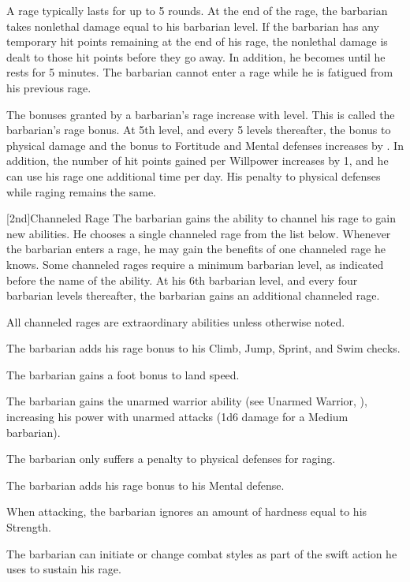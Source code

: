 A rage typically lasts for up to 5 rounds.
At the end of the rage, the barbarian takes nonlethal damage equal to his barbarian level.
If the barbarian has any temporary hit points remaining at the end of his rage, the nonlethal damage is dealt to those hit points before they go away.
In addition, he becomes \fatigued until he rests for 5 minutes.
The barbarian cannot enter a rage while he is fatigued from his previous rage.

The bonuses granted by a barbarian's rage increase with level.
This is called the barbarian's rage bonus.
At 5th level, and every 5 levels thereafter, the bonus to physical damage and the bonus to Fortitude and Mental defenses increases by .
In addition, the number of hit points gained per Willpower increases by 1, and he can use his rage one additional time per day.
His penalty to physical defenses while raging remains the same.

[2nd]{Channeled Rage}
The barbarian gains the ability to channel his rage to gain new abilities.
He chooses a single channeled rage from the list below.
Whenever the barbarian enters a rage, he may gain the benefits of one channeled rage he knows.
Some channeled rages require a minimum barbarian level, as indicated before the name of the ability.
At his 6th barbarian level, and every four barbarian levels thereafter, the barbarian gains an additional channeled rage.

All channeled rages are extraordinary abilities unless otherwise noted.

The barbarian adds his rage bonus to his Climb, Jump, Sprint, and Swim checks.

The barbarian gains a  foot bonus to land speed.

The barbarian gains the unarmed warrior ability (see Unarmed Warrior, ), increasing his power with unarmed attacks (1d6 damage for a Medium barbarian).

The barbarian only suffers a  penalty to physical defenses for raging.

The barbarian adds his rage bonus to his Mental defense.

When attacking, the barbarian ignores an amount of hardness equal to his Strength.

The barbarian can initiate or change combat styles as part of the swift action he uses to sustain his rage.

